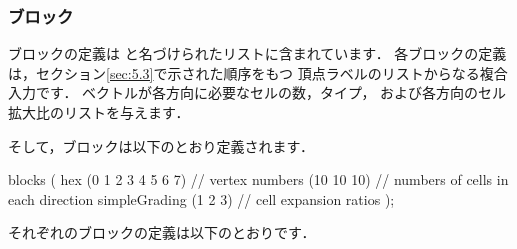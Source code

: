 \subsubsection{ブロック}
\label{sssec:5.3.1.3}
ブロックの定義は
%
%
と名づけられたリストに含まれています．
各ブロックの定義は，セクション\autoref{sec:5.3}で示された順序をもつ
頂点ラベルのリストからなる複合入力です．
ベクトルが各方向に必要なセルの数，タイプ，
および各方向のセル拡大比のリストを与えます．

そして，ブロックは以下のとおり定義されます．
\begin{OFverbatim}[file]
blocks
(
    hex (0 1 2 3 4 5 6 7) // vertex numbers
    (10 10 10) // numbers of cells in each direction
    simpleGrading (1 2 3) // cell expansion ratios
);
\end{OFverbatim}
それぞれのブロックの定義は以下のとおりです．
